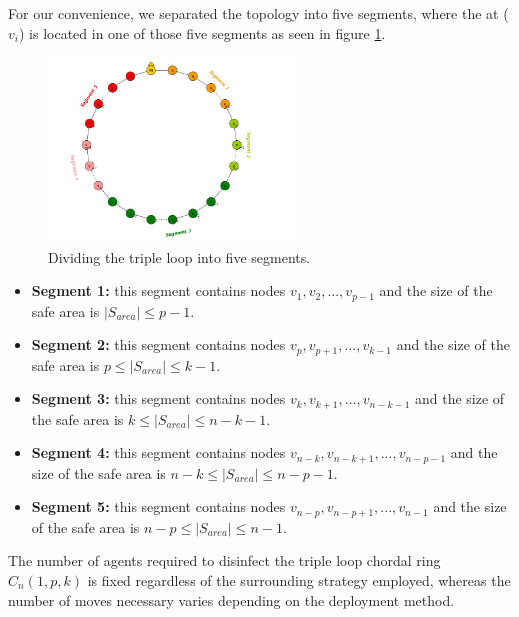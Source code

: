   



For our convenience, we separated the topology into five segments, where the  \bv at ($v_i$) is located in one of those five segments as seen in figure \ref{fig:tloop-seg}.
\begin{figure}[H]
  \centering  
  \includegraphics[width=0.6\textwidth]{figures/tloop_seg.jpg}
  \caption{Dividing the triple loop into five segments.}\label{fig:tloop-seg}
\end{figure}

\begin{itemize}

\item {\bf Segment 1:}  this segment contains nodes $v_1,v_2,...,v_{p-1}$ and the size of the safe area is $ |S_{area}| \leq p-1$.
\item {\bf Segment 2:}  this segment contains nodes $v_p,v_{p+1},...,v_{k-1}$ and the size of the safe area is $p \leq |S_{area}| \leq k-1$.
\item {\bf Segment 3:} this segment contains nodes $v_k,v_{k+1},...,v_{n-k-1}$ and the size of the safe area is $k \leq |S_{area}| \leq n-k-1$.
\item {\bf Segment 4:} this segment contains nodes $v_{n-k},v_{n-k+1},...,v_{n-p-1}$ and the size of the safe area is $n-k \leq |S_{area}| \leq n-p-1$.
\item {\bf Segment 5:}   this segment contains nodes $v_{n-p},v_{n-p+1},...,v_{n-1}$ and the size of the safe area is $n-p \leq |S_{area}| \leq n-1$.
\end{itemize}



The number of agents required to disinfect the triple loop chordal ring $C_n(1,p,k)$ is fixed regardless of  the surrounding strategy employed, whereas the number of moves necessary varies depending on the deployment method.


